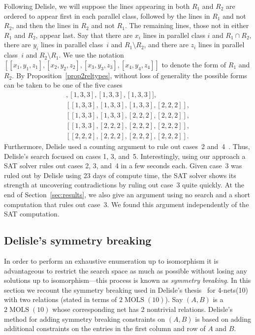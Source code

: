 \documentclass[runningheads]{llncs}
\newcommand{\MOLS}[2]{#1\operatorname{MOLS}(#2)}
\begin{document}
Following Delisle, we will suppose the lines appearing in both $R_1$ and $R_2$ are ordered
to appear first in each parallel class, followed by the lines in $R_1$ and not $R_2$, and then
the lines in $R_2$ and not $R_1$.  The remaining lines, those not in either $R_1$ and $R_2$, appear last.
Say that there are $x_i$ lines in parallel class $i$ and $R_1\cap R_2$, there are
$y_i$ lines in parallel class~$i$ and $R_1\setminus R_2$, and there are $z_i$ lines in parallel class~$i$
and $R_2\setminus R_1$.  We use the notation $[[x_1,y_1,z_1],[x_2,y_2,z_2],[x_3,y_3,z_3],[x_4,y_4,z_4]]$
to denote the form of $R_1$ and $R_2$.  By Proposition~\ref{prop2reltypes}, without loss of generality
the possible forms can be taken to be one of the five cases
\begin{gather}
[[1,3,3],[1,3,3],[1,3,3],[1,3,3]], \tag{case 1} \\
[[1,3,3],[1,3,3],[1,3,3],[2,2,2]], \tag{case 2} \\
[[1,3,3],[1,3,3],[2,2,2],[2,2,2]], \tag{case 3} \\
[[1,3,3],[2,2,2],[2,2,2],[2,2,2]], \tag{case 4} \\
[[2,2,2],[2,2,2],[2,2,2],[2,2,2]]. \tag{case 5}
\end{gather}
Furthermore, Delisle used a counting argument to rule out
cases~2 and~4~\cite[pg.~17]{delisle2010search}.  Thus, Delisle's search focused on cases 1, 3, and~5.
Interestingly, using our approach a SAT solver rules out cases 2, 3, and~4 in a few seconds each.
Given case~3 was ruled out by Delisle using 23 days of compute time, the SAT solver
shows its strength at uncovering contradictions by ruling out case~3 quite quickly.
At the end of Section~\ref{sec:results}, we also give an argument using no search and a short computation
that rules out case~3.  We found this argument
independently of the SAT computation.

\subsection{Delisle's symmetry breaking}\label{sec:symmetry-breaking}

In order to perform an exhaustive enumeration up to isomorphism it is advantageous to restrict the search
space as much as possible without losing any solutions up to isomorphism---this process is known as
\emph{symmetry breaking}.  In this section we recount the symmetry breaking used in Delisle's
thesis~\cite{delisle2010search} for 4-nets(10) with two relations (stated in terms of
$\MOLS{2}{10}$)\@.  Say $(A,B)$ is a $\MOLS{2}{10}$ whose corresponding net has 2 nontrivial relations.
Delisle's method for adding symmetry breaking constraints on $(A,B)$ is based on adding additional
constraints on the entries in the first column and row of $A$ and $B$.
\end{document}
